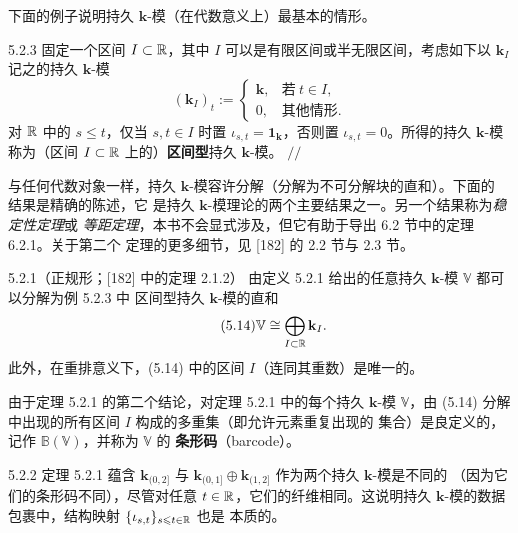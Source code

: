 下面的例子说明持久 $\mathbf k$-模（在代数意义上）最基本的情形。

\begin{wexam}{5.2.3}
固定一个区间 $I\subset\mathbb{R}$，其中 $I$ 可以是有限区间或半无限区间，考虑如下以
$\mathbf k_I$ 记之的持久 $\mathbf k$-模
\[
(\mathbf k_I)_t:=
\begin{cases}
\mathbf k, & \text{若}\ t\in I,\\
0, & \text{其他情形}.
\end{cases}
\]
对 $\mathbb{R}$ 中的 $s\leqslant t$，仅当 $s,t\in I$ 时置
$\iota_{s,t}=\mathbf 1_{\mathbf k}$，否则置 $\iota_{s,t}=0$。所得的持久
$\mathbf k$-模称为（区间 $I\subset\mathbb{R}$ 上的）\textbf{区间型}持久 $\mathbf k$-模。
\hfill$//$
\end{wexam}

与任何代数对象一样，持久 $\mathbf k$-模容许分解（分解为不可分解块的直和）。下面的
结果是精确的陈述，它
是持久 $\mathbf k$-模理论的两个主要结果之一。另一个结果称为\emph{稳定性定理}或
\emph{等距定理}，本书不会显式涉及，但它有助于导出 6.2 节中的定理 6.2.1。关于第二个
定理的更多细节，见 [182] 的 2.2 节与 2.3 节。

\begin{wthm}{5.2.1}（正规形；[182] 中的定理 2.1.2）
由定义 5.2.1 给出的任意持久 $\mathbf k$-模 $\mathbb V$ 都可以分解为例 5.2.3 中
区间型持久 $\mathbf k$-模的直和
\begin{equation}\tag{5.14}
\mathbb V\cong\bigoplus_{I\subset\mathbb{R}}\mathbf k_I.
\end{equation}
此外，在重排意义下，(5.14) 中的区间 $I$（连同其重数）是唯一的。
\end{wthm}


由于定理 5.2.1 的第二个结论，对定理 5.2.1 中的每个持久 $\mathbf k$-模
$\mathbb V$，由 (5.14) 分解中出现的所有区间 $I$ 构成的多重集（即允许元素重复出现的
集合）是良定义的，记作 $\mathbb B(\mathbb V)$，并称为 $\mathbb V$ 的
\textbf{条形码}（barcode）。

\begin{wrem}{5.2.2}
定理 5.2.1 蕴含 $\mathbf k_{(0,2]}$ 与
$\mathbf k_{(0,1]}\oplus\mathbf k_{(1,2]}$ 作为两个持久 $\mathbf k$-模是不同的
（因为它们的条形码不同），尽管对任意 $t\in\mathbb{R}$，它们的纤维相同。这说明持久
$\mathbf k$-模的数据包裹中，结构映射 $\{\iota_{s,t}\}_{s\leqslant t\in\mathbb{R}}$ 也是
本质的。
\end{wrem}

